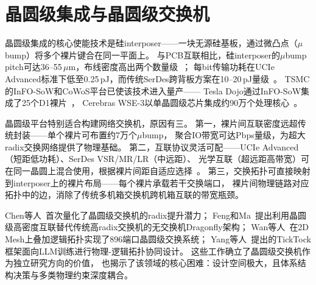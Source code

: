\section{晶圆级集成与晶圆级交换机}

晶圆级集成的核心使能技术是硅interposer——一块无源硅基板，通过微凸点（$\mu$bump）将多个裸片键合在同一平面上。
与PCB互联相比，硅interposer的$\mu$bump pitch可达36--55\,$\mu$m，布线密度高出两个数量级~\cite{ucie2.0-2024}；
每bit传输功耗在UCIe Advanced标准下低至0.25\,pJ，而传统SerDes跨背板方案在10--20\,pJ量级~\cite{oif-cei-5.1}。
TSMC的InFO-SoW和CoWoS平台已使该技术进入量产——
Tesla Dojo通过InFO-SoW集成了25个D1裸片~\cite{tesla2022dojo}，
Cerebras WSE-3以单晶圆级芯片集成约90万个处理核心~\cite{cerebras2022wse2}。

晶圆级平台特别适合构建网络交换机，原因有三。
第一，裸片间互联密度远超传统封装——单个裸片可布置约7万个$\mu$bump，
聚合IO带宽可达Pbps量级，为超大radix交换网络提供了物理基础。
第二，互联协议灵活可配——UCIe Advanced（短距低功耗）、SerDes VSR/MR/LR（中远距）、
光学互联（超远距高带宽）可在同一晶圆上混合使用，根据裸片间距自适应选择~\cite{ucie2.0-2024,oif-cei-5.1}。
第三，交换拓扑可直接映射到interposer上的裸片布局——每个裸片承载若干交换端口，
裸片间物理链路对应拓扑中的边，消除了传统多机箱交换机跨机箱互联的带宽瓶颈。

Chen等人~\cite{chen2024waferscale}首次量化了晶圆级交换机的radix提升潜力；
Feng和Ma~\cite{feng2024switchless}提出利用晶圆级高密度互联替代传统高radix交换机的无交换机Dragonfly架构；
Wan等人~\cite{wan2024architectural}在2D Mesh上叠加逻辑拓扑实现了896端口晶圆级交换系统；
Yang等人~\cite{yang2025pd}提出的TickTock框架面向LLM训练进行物理-逻辑拓扑协同设计。
这些工作确立了晶圆级交换机作为独立研究方向的价值，
也揭示了该领域的核心困难：设计空间极大，且体系结构决策与多类物理约束深度耦合。
